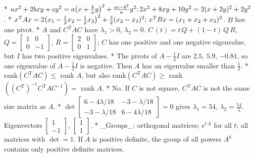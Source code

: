 * \(ax^{2}+2bxy+cy^{2}=a\big{(}x+\frac{b}{a}y\big{)}^{2}+\frac{ac-b^{2}}{a}y^{2} ;2x^{2}+8xy+10y^{2}=2(x+2y)^{2}+2y^{2}\).
* \(x^{\mathrm{T}}Ax=2\big{(}x_{1}-\frac{1}{2}x_{2}-\frac{1}{2}x_{3}\big{)}^{2}+ \frac{3}{2}(x_{2}-x_{3})^{2};\,x^{\mathrm{T}}Bx=(x_{1}+x_{2}+x_{3})^{2}\). \(B\) has one pivot.
* \(A\) and \(C^{\mathrm{T}}AC\) have \(\lambda_{1}>0\), \(\lambda_{2}=0\). \(C\,(t)=t\,Q+(1-t)\,Q\,R\), \(Q=\begin{bmatrix}1&0\\ 0&-1\end{bmatrix}\), \(R=\begin{bmatrix}2&0\\ 0&1\end{bmatrix}\); \(C\) has one positive and one negative eigenvalue, but \(I\) has two positive eigenvalues.
* The pivots of \(A-\frac{1}{2}I\) are \(2.5\), \(5.9\), \(-0.81\), so one eigenvalue of \(A-\frac{1}{2}I\) is negative. Then \(A\) has an eigenvalue smaller than \(\frac{1}{2}\).
* \(\mathrm{rank}(C^{\mathrm{T}}AC)\leq\) rank \(A\), but also \(\mathrm{rank}(C^{\mathrm{T}}AC)\geq\) rank \(((C^{\mathrm{T}})^{-1}C^{\mathrm{T}}AC^{-1})=\) rank \(A\).
* No. If \(C\) is not square, \(C^{\mathrm{T}}AC\) is not the same size matrix as \(A\).
* \(\det\begin{bmatrix}6-4\lambda/18&-3-\lambda/18\\ -3-\lambda/18&6-4\lambda/18\end{bmatrix}=0\) gives \(\lambda_{1}=54\), \(\lambda_{2}=\frac{54}{5}\). Eigenvectors \(\begin{bmatrix}1\\ -1\end{bmatrix}\), \(\begin{bmatrix}1\\ 1\end{bmatrix}\).
* _Groups_: orthogonal matrices; \(e^{t\,A}\) for all \(t\); all matrices with \(\det=1\). If \(A\) is positive definite, the group of all powers \(A^{k}\) contains only positive definite matrices.

 
